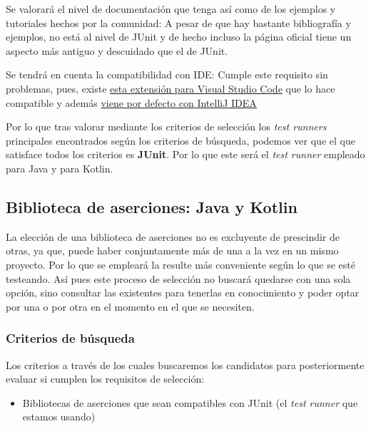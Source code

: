 \begin{todolist}
    \item Se valorará el nivel de documentación que tenga así como de los
    ejemplos y tutoriales hechos por la comunidad: A pesar de que hay bastante
    bibliografía y ejemplos, no está al nivel de JUnit y de hecho incluso la
    página oficial tiene un aspecto más antiguo y descuidado que el de JUnit.
    \item[\xcmark] Se tendrá en cuenta la compatibilidad con IDE: Cumple este
    requisito sin problemas, pues, existe
    \href{https://code.visualstudio.com/docs/java/java-testing}{esta extensión para
    Visual Studio Code} que lo hace compatible y además
    \href{https://www.jetbrains.com/help/idea/testng.html}{viene por defecto con
    IntelliJ IDEA}
\end{todolist}


Por lo que tras valorar mediante los criterios de selección los \emph{test
runners} principales encontrados según los criterios de búsqueda, podemos ver
que el que satisface todos los criterios es \textbf{JUnit}. Por lo que este será
el \emph{test runner} empleado para Java y para Kotlin.


\subsection{Biblioteca de aserciones: Java y Kotlin}

La elección de una biblioteca de aserciones no es excluyente de prescindir de
otras, ya que, puede haber conjuntamente más de una a la vez en un mismo
proyecto. Por lo que se empleará la resulte más conveniente según lo que se esté
testeando. Así pues este proceso de selección no buscará quedarse con una sola
opción, sino consultar las existentes para tenerlas en conocimiento y poder
optar por una o por otra en el momento en el que se necesiten.

\subsubsection{Criterios de búsqueda}

Los criterios a través de los cuales buscaremos los candidatos para
posteriormente evaluar si cumplen los requisitos de selección:
\begin{itemize}
    \item Bibliotecas de aserciones que sean compatibles con JUnit (el
    \emph{test runner} que estamos usando)
\end{itemize}

